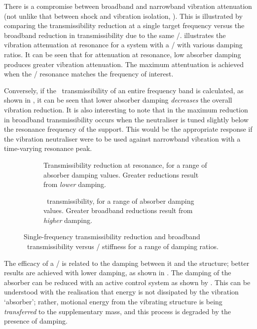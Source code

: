 \documentclass[11pt,a4paper]{memoir}
\begin{document}
There is a compromise between broadband and narrowband vibration attenuation (not unlike that between shock and vibration isolation, ).
This is illustrated by comparing the transmissibility reduction at a single target frequency versus the broadband reduction in transmissibility due to the same \vibneut/.
 illustrates the vibration attenuation at resonance for a system with a \vibneut/ with various damping ratios.
It can be seen that for attenuation at resonance, low absorber damping produces greater vibration attenuation.
The maximum attentuation is achieved when the \vibneut/ resonance matches the frequency of interest.

Conversely, if the \RMS\ transmissibility of an entire frequency band is calculated, as shown in , it can be seen that lower absorber damping \emph{decreases} the overall vibration reduction.
It is also interesting to note that in  the maximum reduction in broadband transmissibility occurs when the neutraliser is tuned slightly below the resonance frequency of the support.
This would be the appropriate response if the vibration neutraliser were to be used against narrowband vibration with a time-varying resonance peak.

\begin{figure}
\begin{wide}
  \begin{subfigure}
    \caption{
      Transmissibility reduction at resonance, for a range of absorber damping values.
      Greater reductions result from \emph{lower} damping.}
  \end{subfigure}
  \qquad\qquad
  \begin{subfigure}
    \caption{
      \RMS\ transmissibility, for a range of absorber damping values.
      Greater broadband reductions result from \emph{higher} damping.}
  \end{subfigure}
\end{wide}
\caption{
  Single-frequency transmissibility reduction and broadband \RMS\ transmissibility versus \vibneut/ stiffness for a range of damping ratios.
}
\end{figure}

The efficacy of a \vibneut/ is related to the damping between it and the structure; better results are achieved with lower damping, as shown in .
The damping of the absorber can be reduced with an active control system as shown by \textcite{kidner1998}.
This can be understood with the realisation that energy is not dissipated by the vibration `absorber'; rather, motional energy from the vibrating structure is being \emph{transferred} to the supplementary mass, and this process is degraded by the presence of damping.
\end{document}
